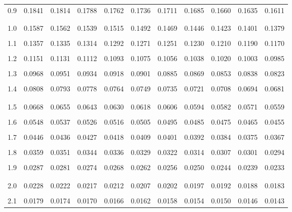 \documentclass{report}
\begin{document}
\begin{center}
\begin{tabular*}{\linewidth}{@{\extracolsep{\fill}} |c|c|ccc|ccc|ccc|}
    0.9 & 0.1841 & 0.1814 & 0.1788 & 0.1762 & 0.1736 & 0.1711 & 0.1685 & 0.1660 & 0.1635 & 0.1611 \\
    \\[-1em]
    \hline
    \\[-1em]
    1.0 & 0.1587 & 0.1562 & 0.1539 & 0.1515 & 0.1492 & 0.1469 & 0.1446 & 0.1423 & 0.1401 & 0.1379 \\
    \\[-1em]
    1.1 & 0.1357 & 0.1335 & 0.1314 & 0.1292 & 0.1271 & 0.1251 & 0.1230 & 0.1210 & 0.1190 & 0.1170 \\
    \\[-1em]
    1.2 & 0.1151 & 0.1131 & 0.1112 & 0.1093 & 0.1075 & 0.1056 & 0.1038 & 0.1020 & 0.1003 & 0.0985 \\
    \\[-1em]
    1.3 & 0.0968 & 0.0951 & 0.0934 & 0.0918 & 0.0901 & 0.0885 & 0.0869 & 0.0853 & 0.0838 & 0.0823 \\
    \\[-1em]
    1.4 & 0.0808 & 0.0793 & 0.0778 & 0.0764 & 0.0749 & 0.0735 & 0.0721 & 0.0708 & 0.0694 & 0.0681 \\
    \\[-1em]
    \hline
    \\[-1em]
    1.5 & 0.0668 & 0.0655 & 0.0643 & 0.0630 & 0.0618 & 0.0606 & 0.0594 & 0.0582 & 0.0571 & 0.0559 \\
    \\[-1em]
    1.6 & 0.0548 & 0.0537 & 0.0526 & 0.0516 & 0.0505 & 0.0495 & 0.0485 & 0.0475 & 0.0465 & 0.0455 \\
    \\[-1em]
    1.7 & 0.0446 & 0.0436 & 0.0427 & 0.0418 & 0.0409 & 0.0401 & 0.0392 & 0.0384 & 0.0375 & 0.0367 \\
    \\[-1em]
    1.8 & 0.0359 & 0.0351 & 0.0344 & 0.0336 & 0.0329 & 0.0322 & 0.0314 & 0.0307 & 0.0301 & 0.0294 \\
    \\[-1em]
    1.9 & 0.0287 & 0.0281 & 0.0274 & 0.0268 & 0.0262 & 0.0256 & 0.0250 & 0.0244 & 0.0239 & 0.0233 \\
    \\[-1em]
    \hline
    \\[-1em]
    2.0 & 0.0228 & 0.0222 & 0.0217 & 0.0212 & 0.0207 & 0.0202 & 0.0197 & 0.0192 & 0.0188 & 0.0183 \\
    \\[-1em]
    2.1 & 0.0179 & 0.0174 & 0.0170 & 0.0166 & 0.0162 & 0.0158 & 0.0154 & 0.0150 & 0.0146 & 0.0143 \\

\end{tabular*}
\end{center}
\end{document}
